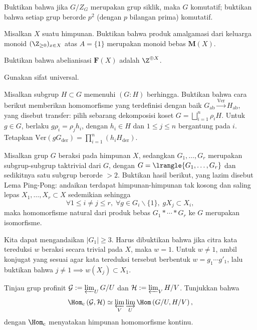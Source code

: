 \begin{Exercises}
	\item Buktikan bahwa jika $G/Z_G$ merupakan grup siklik, maka $G$ komutatif; buktikan bahwa setiap grup berorde $p^2$ (dengan $p$ bilangan prima) komutatif.
	\item Misalkan $X$ suatu himpunan. Buktikan bahwa produk amalgamasi dari keluarga monoid $(\Z_{\geq 0})_{x \in X}$ atas $A=\{1\}$ merupakan monoid bebas $\mathbf{M}(X)$.
	\item Buktikan bahwa abelianisasi $\mathbf{F}(X)$ adalah $\Z^{\oplus X}$. \begin{hint} Gunakan sifat universal. \end{hint}
	\item Misalkan subgrup $H \subset G$ memenuhi $(G:H)$ berhingga. Buktikan bahwa cara berikut memberikan homomorfisme yang terdefinisi dengan baik $G_\text{ab} \xrightarrow{\text{Ver}} H_\text{ab}$, yang disebut transfer: pilih sebarang dekomposisi koset $G = \bigsqcup_{i=1}^n \rho_i H$. Untuk $g \in G$, berlaku $g \rho_i = \rho_j h_i$, dengan $h_i \in H$ dan $1 \leq j \leq n$ bergantung pada $i$. Tetapkan $\text{Ver}(g G_\text{der}) = \prod_{i=1}^n \left( h_i H_\text{der}\right)$.
	\item Misalkan grup $G$ beraksi pada himpunan $X$, sedangkan $G_1, \ldots, G_r$ merupakan subgrup-subgrup taktrivial dari $G$, dengan $G=\lrangle{G_1, \ldots, G_r}$ dan sedikitnya satu subgrup berorde $> 2$. Buktikan hasil berikut, yang lazim disebut Lema Ping-Pong: andaikan terdapat himpunan-himpunan tak kosong dan saling lepas $X_1, \ldots, X_r \subset X$ sedemikian sehingga
		\[ \forall 1 \leq i \neq j \leq r, \; \forall g \in G_i \smallsetminus \{1\}, \; g X_j \subset X_i, \]
		maka homomorfisme natural dari produk bebas $G_1 \ast \cdots \ast G_r$ ke $G$ merupakan isomorfisme. \begin{hint} Kita dapat mengandaikan $|G_1| \geq 3$. Harus dibuktikan bahwa jika citra kata tereduksi $w$ beraksi secara trivial pada $X$, maka $w=1$. Untuk $w \neq 1$, ambil konjugat yang sesuai agar kata tereduksi tersebut berbentuk $w = g_1 \cdots g'_1$, lalu buktikan bahwa $j \neq 1 \implies w(X_j) \subset X_1$.\end{hint}
	\item Tinjau grup profinit $\mathcal{G} := \varprojlim_U G/U$ dan $\mathcal{H} := \varprojlim_V H/V$. Tunjukkan bahwa
		\[ \Hom_{\mathrm{c}}\left( \mathcal{G}, \mathcal{H} \right) \simeq \varprojlim_V \varinjlim_U \Hom\left(G/U, H/V \right), \]
		dengan $\Hom_{\mathrm{c}}$ menyatakan himpunan homomorfisme kontinu.
\end{Exercises}

